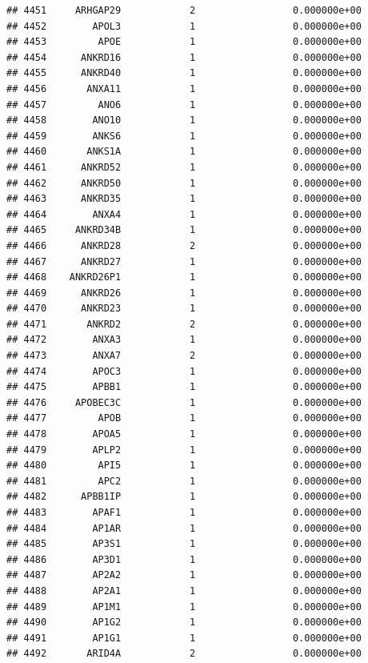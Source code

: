\documentclass[
]{article}
\begin{document}
\begin{verbatim}
## 4451     ARHGAP29            2                 0.000000e+00
## 4452        APOL3            1                 0.000000e+00
## 4453         APOE            1                 0.000000e+00
## 4454      ANKRD16            1                 0.000000e+00
## 4455      ANKRD40            1                 0.000000e+00
## 4456       ANXA11            1                 0.000000e+00
## 4457         ANO6            1                 0.000000e+00
## 4458        ANO10            1                 0.000000e+00
## 4459        ANKS6            1                 0.000000e+00
## 4460       ANKS1A            1                 0.000000e+00
## 4461      ANKRD52            1                 0.000000e+00
## 4462      ANKRD50            1                 0.000000e+00
## 4463      ANKRD35            1                 0.000000e+00
## 4464        ANXA4            1                 0.000000e+00
## 4465     ANKRD34B            1                 0.000000e+00
## 4466      ANKRD28            2                 0.000000e+00
## 4467      ANKRD27            1                 0.000000e+00
## 4468    ANKRD26P1            1                 0.000000e+00
## 4469      ANKRD26            1                 0.000000e+00
## 4470      ANKRD23            1                 0.000000e+00
## 4471       ANKRD2            2                 0.000000e+00
## 4472        ANXA3            1                 0.000000e+00
## 4473        ANXA7            2                 0.000000e+00
## 4474        APOC3            1                 0.000000e+00
## 4475        APBB1            1                 0.000000e+00
## 4476     APOBEC3C            1                 0.000000e+00
## 4477         APOB            1                 0.000000e+00
## 4478        APOA5            1                 0.000000e+00
## 4479        APLP2            1                 0.000000e+00
## 4480         API5            1                 0.000000e+00
## 4481         APC2            1                 0.000000e+00
## 4482      APBB1IP            1                 0.000000e+00
## 4483        APAF1            1                 0.000000e+00
## 4484        AP1AR            1                 0.000000e+00
## 4485        AP3S1            1                 0.000000e+00
## 4486        AP3D1            1                 0.000000e+00
## 4487        AP2A2            1                 0.000000e+00
## 4488        AP2A1            1                 0.000000e+00
## 4489        AP1M1            1                 0.000000e+00
## 4490        AP1G2            1                 0.000000e+00
## 4491        AP1G1            1                 0.000000e+00
## 4492       ARID4A            2                 0.000000e+00

\end{verbatim}
\end{document}
